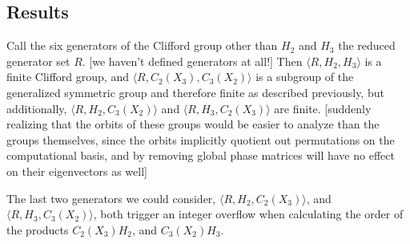 \subsection{Results}
Call the six generators of the Clifford group other than $H_2$ and $H_3$ the reduced generator set $R$. [we haven't defined generators at all!] Then $\langle R, H_2, H_3 \rangle$ is a finite Clifford group, and $\langle R, C_2(X_3), C_3(X_2) \rangle$ is a subgroup of the generalized symmetric group and therefore finite as described previously, but additionally, $\langle R, H_2, C_3(X_2)\rangle$ and $\langle R, H_3, C_2(X_3)\rangle$ are finite. [suddenly realizing that the orbits of these groups would be easier to analyze than the groups themselves, since the orbits implicitly quotient out permutations on the computational basis, and by removing global phase matrices will have no effect on their eigenvectors as well]

The last two generators we could consider, $\langle R, H_2, C_2(X_3)\rangle$, and $\langle R, H_3, C_3(X_2)\rangle$, both trigger an integer overflow when calculating the order of the products $C_2(X_3)H_2$, and $C_3(X_2)H_3$.

